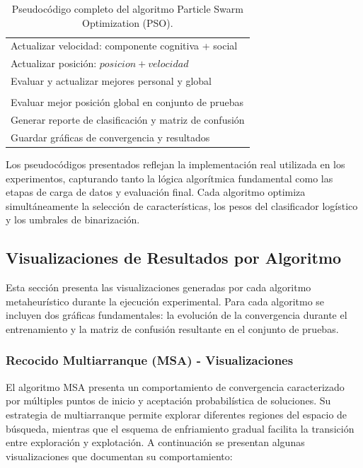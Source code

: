 \begin{table}[htbp]
{\begin{tabular}{|l|l|}
\multicolumn{2}{|l|}{\quad \quad Actualizar velocidad: componente cognitiva + social} \\
\multicolumn{2}{|l|}{\quad \quad Actualizar posición: $posicion + velocidad$} \\
\multicolumn{2}{|l|}{\quad \quad Evaluar y actualizar mejores personal y global} \\
\hline
\rowcolor{UAMAzcapoLight!40}
\multicolumn{2}{|l|}{\textbf{3. Evaluación final:}} \\
\hline
\multicolumn{2}{|l|}{Evaluar mejor posición global en conjunto de pruebas} \\
\multicolumn{2}{|l|}{Generar reporte de clasificación y matriz de confusión} \\
\multicolumn{2}{|l|}{Guardar gráficas de convergencia y resultados} \\
\hline
\end{tabular}
}
\caption{Pseudocódigo completo del algoritmo Particle Swarm Optimization (PSO).}
\label{tab:pseudocodigo_pso}
\end{table}

Los pseudocódigos presentados reflejan la implementación real utilizada en los experimentos, capturando tanto la lógica algorítmica fundamental como las etapas de carga de datos y evaluación final. Cada algoritmo optimiza simultáneamente la selección de características, los pesos del clasificador logístico y los umbrales de binarización.

\subsection{Visualizaciones de Resultados por Algoritmo}
\label{subsec:visualizaciones_algoritmos}

Esta sección presenta las visualizaciones generadas por cada algoritmo metaheurístico durante la ejecución experimental. Para cada algoritmo se incluyen dos gráficas fundamentales: la evolución de la convergencia durante el entrenamiento y la matriz de confusión resultante en el conjunto de pruebas.

\subsubsection{Recocido Multiarranque (MSA) - Visualizaciones}

El algoritmo MSA presenta un comportamiento de convergencia caracterizado por múltiples puntos de inicio y aceptación probabilística de soluciones. Su estrategia de multiarranque permite explorar diferentes regiones del espacio de búsqueda, mientras que el esquema de enfriamiento gradual facilita la transición entre exploración y explotación. A continuación se presentan algunas visualizaciones que documentan su comportamiento:

